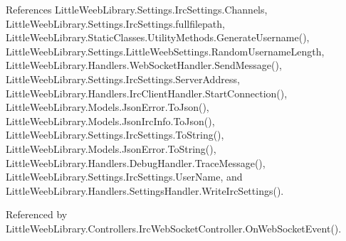 References Little\+Weeb\+Library.\+Settings.\+Irc\+Settings.\+Channels, Little\+Weeb\+Library.\+Settings.\+Irc\+Settings.\+fullfilepath, Little\+Weeb\+Library.\+Static\+Classes.\+Utility\+Methods.\+Generate\+Username(), Little\+Weeb\+Library.\+Settings.\+Little\+Weeb\+Settings.\+Random\+Username\+Length, Little\+Weeb\+Library.\+Handlers.\+Web\+Socket\+Handler.\+Send\+Message(), Little\+Weeb\+Library.\+Settings.\+Irc\+Settings.\+Server\+Address, Little\+Weeb\+Library.\+Handlers.\+Irc\+Client\+Handler.\+Start\+Connection(), Little\+Weeb\+Library.\+Models.\+Json\+Error.\+To\+Json(), Little\+Weeb\+Library.\+Models.\+Json\+Irc\+Info.\+To\+Json(), Little\+Weeb\+Library.\+Settings.\+Irc\+Settings.\+To\+String(), Little\+Weeb\+Library.\+Models.\+Json\+Error.\+To\+String(), Little\+Weeb\+Library.\+Handlers.\+Debug\+Handler.\+Trace\+Message(), Little\+Weeb\+Library.\+Settings.\+Irc\+Settings.\+User\+Name, and Little\+Weeb\+Library.\+Handlers.\+Settings\+Handler.\+Write\+Irc\+Settings().



Referenced by Little\+Weeb\+Library.\+Controllers.\+Irc\+Web\+Socket\+Controller.\+On\+Web\+Socket\+Event().


